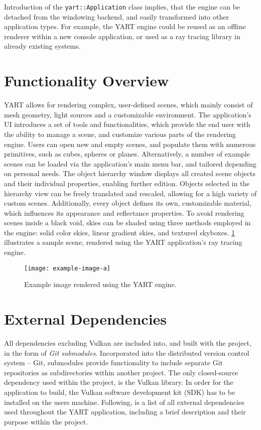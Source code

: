 Introduction of the \verb|yart::Application| class implies, that the engine can be detached from the windowing backend, and easily transformed into other application types.
For example, the YART engine could be reused as an offline renderer within a new console application, or used as a ray tracing library in already existing systems.

\section{Functionality Overview}

YART allows for rendering complex, user-defined scenes, which mainly consist of mesh geometry, light sources and a customizable environment.
The application's UI introduces a set of tools and functionalities, which provide the end user with the ability to manage a scene, and customize various parts of the rendering engine.
Users can open new and empty scenes, and populate them with numerous primitives, such as cubes, spheres or planes.
Alternatively, a number of example scenes can be loaded via the application's main menu bar, and tailored depending on personal needs. 
The object hierarchy window displays all created scene objects and their individual properties, enabling further edition.
Objects selected in the hierarchy view can be freely translated and rescaled, allowing for a high variety of custom scenes.
Additionally, every object defines its own, customizable material, which influences its appearance and reflectance properties.
To avoid rendering scenes inside a black void, skies can be shaded using three methods employed in the engine: solid color skies, linear gradient skies, and textured skyboxes.
\cref{fig:Application/FunctionalityOverview/render_sample} illustrates a sample scene, rendered using the YART application's ray tracing engine.

\begin{figure}[!ht]
    \centering
    \texttt{[image: example-image-a]}
    \caption[Example image rendered using the YART engine]{Example image rendered using the YART engine.}
    \label{fig:Application/FunctionalityOverview/render_sample}
\end{figure}

\section{External Dependencies}

All dependencies excluding Vulkan are included into, and built with the project, in the form of \textit{Git submodules}. 
Incorporated into the distributed version control system -- Git, submodules provide functionality to include separate Git repositories as subdirectories within another project.
The only closed-source dependency used within the project, is the Vulkan library.
In order for the application to build, the Vulkan software development kit (SDK) has to be installed on the users machine. 
Following, is a list of all external dependencies used throughout the YART application, including a brief description and their purpose within the project.

